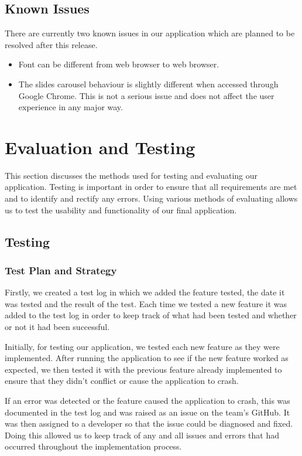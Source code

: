 \documentclass{l3proj}
\begin{document}
{\section{Known Issues}
There are currently two known issues in our application which are planned to be resolved after this release.\\
\begin{itemize}
\item Font can be different from web browser to web browser.
\item The slides carousel behaviour is slightly different when accessed through Google Chrome. This is not a serious issue and does not affect the user experience in any major way.
\end{itemize}

\chapter{Evaluation and Testing}
\label{evaluation}

This section discusses the methods used for testing and evaluating our application. Testing is important in order to ensure that all requirements are met and to identify and rectify any errors. Using various methods of evaluating allows us to test the usability and functionality of our final application.

\section{Testing}

\subsection{Test Plan and Strategy}

Firstly, we created a test log in which we added the feature tested, the date it was tested and the result of the test. Each time we tested a new feature it was added to the test log in order to keep track of what had been tested and whether or not it had been successful.

Initially, for testing our application, we tested each new feature as they were implemented. After running the application to see if the new feature worked as expected, we then tested it with the previous feature already implemented to ensure that they didn't conflict or cause the application to crash.

If an error was detected or the feature caused the application to crash, this was documented in the test log and was raised as an issue on the team's GitHub. It was then assigned to a developer so that the issue could be diagnosed and fixed. Doing this allowed us to keep track of any and all issues and errors that had occurred throughout the implementation process.

}
\end{document}
